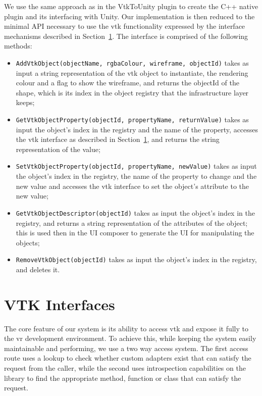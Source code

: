 We use the same approach as in the VtkToUnity plugin to create the C++ native plugin and its interfacing with Unity. Our implementation is then reduced to the minimal API necessary to use the \acrshort{vtk} functionality expressed by the interface mechanisms described in Section~\ref{sec:design-interfaces}. The interface is comprised of the following methods:

\begin{itemize}[leftmargin=1.5truecm]
    \setlength{\itemindent}{-1truecm}
    \item[] \verb|AddVtkObject(objectName, rgbaColour, wireframe, objectId)| takes as input a string representation of the \acrshort{vtk} object to instantiate, the rendering colour and a flag to show the wireframe, and returns the objectId of the shape, which is its index in the object registry that the infrastructure layer keeps;
    \item[] \verb|GetVtkObjectProperty(objectId, propertyName, returnValue)| takes as input the object's index in the registry and the name of the property, accesses the \acrshort{vtk} interface as described in Section~\ref{sec:design-interfaces}, and returns the string representation of the value;
    \item[] \verb|SetVtkObjectProperty(objectId, propertyName, newValue)| takes as input the object's index in the registry, the name of the property to change and the new value and accesses the \acrshort{vtk} interface to set the object's attribute to the new value;
    \item[] \verb|GetVtkObjectDescriptor(objectId)| takes as input the object's index in the registry, and returns a string representation of the attributes of the object; this is used then in the UI composer to generate the UI for manipulating the objects;
    \item[] \verb|RemoveVtkObject(objectId)| takes as input the object's index in the registry, and deletes it.
\end{itemize}

\section{VTK Interfaces}
\label{sec:design-interfaces}

The core feature of our system is its ability to access \acrshort{vtk} and expose it fully to the \acrshort{vr} development environment. To achieve this, while keeping the system easily maintainable and performing, we use a two way access system. The first access route uses a lookup to check whether custom adapters exist that can satisfy the request from the caller, while the second uses introspection capabilities on the library to find the appropriate method, function or class that can satisfy the request.


